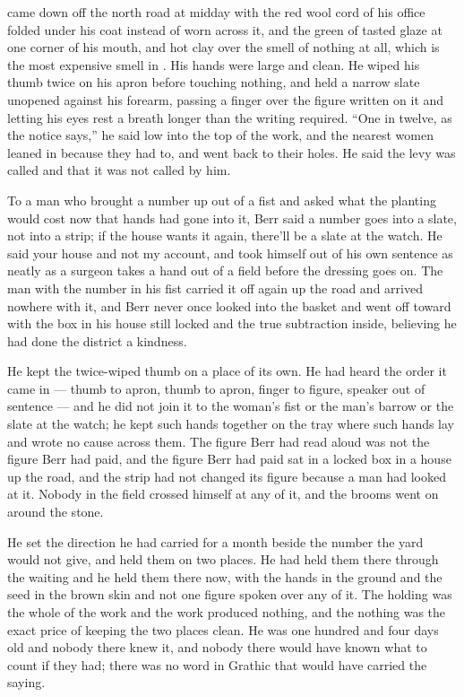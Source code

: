 \scenebreak

 came down off the north road at midday with the red wool cord of his office folded under his coat instead of worn across it, and the green of tasted glaze at one corner of his mouth, and hot clay over the smell of nothing at all, which is the most expensive smell in . His hands were large and clean. He wiped his thumb twice on his apron before touching nothing, and held a narrow slate unopened against his forearm, passing a finger over the figure written on it and letting his eyes rest a breath longer than the writing required. “One in twelve, as the notice says,” he said low into the top of the work, and the nearest women leaned in because they had to, and went back to their holes. He said the levy was called and that it was not called by him.

To a man who brought a number up out of a fist and asked what the planting would cost now that hands had gone into it, Berr said a number goes into a slate, not into a strip; if the house wants it again, there'll be a slate at the watch. He said your house and not my account, and took himself out of his own sentence as neatly as a surgeon takes a hand out of a field before the dressing goes on. The man with the number in his fist carried it off again up the road and arrived nowhere with it, and Berr never once looked into the basket and went off toward  with the box in his house still locked and the true subtraction inside, believing he had done the district a kindness.

He kept the twice-wiped thumb on a place of its own. He had heard the order it came in --- thumb to apron, thumb to apron, finger to figure, speaker out of sentence --- and he did not join it to the woman's fist or the man's barrow or the slate at the watch; he kept such hands together on the tray where such hands lay and wrote no cause across them. The figure Berr had read aloud was not the figure Berr had paid, and the figure Berr had paid sat in a locked box in a house up the road, and the strip had not changed its figure because a man had looked at it. Nobody in the field crossed himself at any of it, and the brooms went on around the stone.

\scenebreak

He set the direction he had carried for a month beside the number the yard would not give, and held them on two places. He had held them there through the waiting and he held them there now, with the hands in the ground and the seed in the brown skin and not one figure spoken over any of it. The holding was the whole of the work and the work produced nothing, and the nothing was the exact price of keeping the two places clean. He was one hundred and four days old and nobody there knew it, and nobody there would have known what to count if they had; there was no word in Grathic that would have carried the saying.

